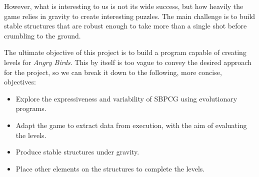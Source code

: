 However, what is interesting to us is not its wide success, but how heavily the game relies in gravity to create interesting puzzles. The main challenge is to build stable structures that are robust enough to take more than a single shot before crumbling to the ground.

The ultimate objective of this project is to build a program capable of creating levels for \textit{Angry Birds}. This by itself is too vague to convey the desired approach for the project, so we can break it down to the following, more concise, objectives:

\begin{itemize}
	\item Explore the expressiveness and variability of SBPCG using evolutionary programs.
	\item Adapt the game to extract data from execution, with the aim of evaluating the levels.
	\item Produce stable structures under gravity.
	\item Place other elements on the structures to complete the levels.
\end{itemize} 


